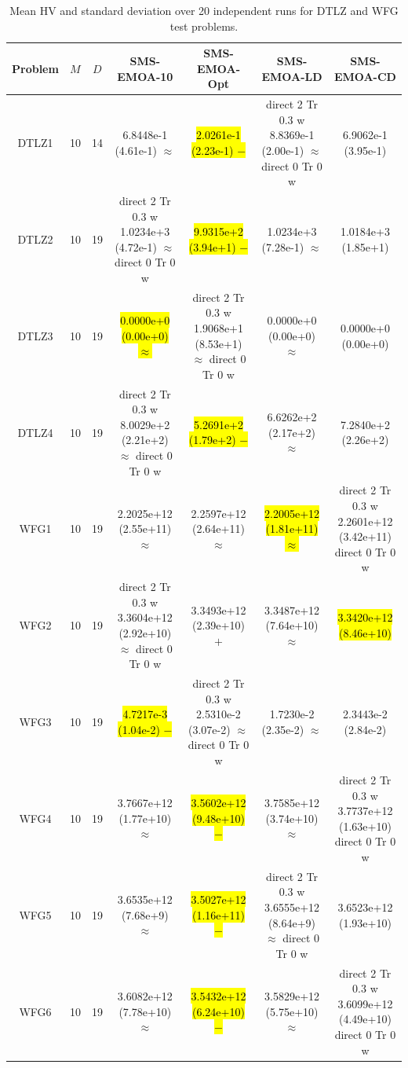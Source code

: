 \documentclass[conference]{IEEEtran}
\newcommand{\semitextbf}[1]{%
	\pdfliteral direct {2 Tr 0.3 w} %
	#1%
	\pdfliteral direct {0 Tr 0 w}%
}
\begin{document}
\begin{table}[!t]\footnotesize
  \renewcommand{\arraystretch}{1.3}
  \caption{Mean HV and standard deviation over 20 independent runs for DTLZ and WFG test problems.}
  \label{table_tri}
  \centering
  \begin{tabular}{ccccccc}
    \toprule
    Problem&$M$&$D$&SMS-EMOA-10&SMS-EMOA-Opt&SMS-EMOA-LD&SMS-EMOA-CD\\ 
    \midrule
    \multirow{1}{*}{DTLZ1}&10&14&6.8448e-1 (4.61e-1) $\approx$&\hl{2.0261e-1 (2.23e-1) $-$}&\semitextbf{8.8369e-1 (2.00e-1) $\approx$}&6.9062e-1 (3.95e-1)\\
    \multirow{1}{*}{DTLZ2}&10&19&\semitextbf{1.0234e+3 (4.72e-1) $\approx$}&\hl{9.9315e+2 (3.94e+1) $-$}&1.0234e+3 (7.28e-1) $\approx$&1.0184e+3 (1.85e+1)\\
    \multirow{1}{*}{DTLZ3}&10&19&\hl{0.0000e+0 (0.00e+0) $\approx$}&\semitextbf{1.9068e+1 (8.53e+1) $\approx$}&0.0000e+0 (0.00e+0) $\approx$&0.0000e+0 (0.00e+0)\\
    \multirow{1}{*}{DTLZ4}&10&19&\semitextbf{8.0029e+2 (2.21e+2) $\approx$}&\hl{5.2691e+2 (1.79e+2) $-$}&6.6262e+2 (2.17e+2) $\approx$&7.2840e+2 (2.26e+2)\\
    \midrule
    \multirow{1}{*}{WFG1}&10&19&2.2025e+12 (2.55e+11) $\approx$&2.2597e+12 (2.64e+11) $\approx$&\hl{2.2005e+12 (1.81e+11) $\approx$}&\semitextbf{2.2601e+12 (3.42e+11)}\\
    \multirow{1}{*}{WFG2}&10&19&\semitextbf{3.3604e+12 (2.92e+10) $\approx$}&3.3493e+12 (2.39e+10) $+$&3.3487e+12 (7.64e+10) $\approx$&\hl{3.3420e+12 (8.46e+10)}\\
    \multirow{1}{*}{WFG3}&10&19&\hl{4.7217e-3 (1.04e-2) $-$}&\semitextbf{2.5310e-2 (3.07e-2) $\approx$}&1.7230e-2 (2.35e-2) $\approx$&2.3443e-2 (2.84e-2)\\
    \multirow{1}{*}{WFG4}&10&19&3.7667e+12 (1.77e+10) $\approx$&\hl{3.5602e+12 (9.48e+10) $-$}&3.7585e+12 (3.74e+10) $\approx$&\semitextbf{3.7737e+12 (1.63e+10)}\\
    \multirow{1}{*}{WFG5}&10&19&3.6535e+12 (7.68e+9) $\approx$&\hl{3.5027e+12 (1.16e+11) $-$}&\semitextbf{3.6555e+12 (8.64e+9) $\approx$}&3.6523e+12 (1.93e+10)\\
    \multirow{1}{*}{WFG6}&10&19&3.6082e+12 (7.78e+10) $\approx$&\hl{3.5432e+12 (6.24e+10) $-$}&3.5829e+12 (5.75e+10) $\approx$&\semitextbf{3.6099e+12 (4.49e+10)}\\

\end{tabular}
\end{table}
\end{document}
